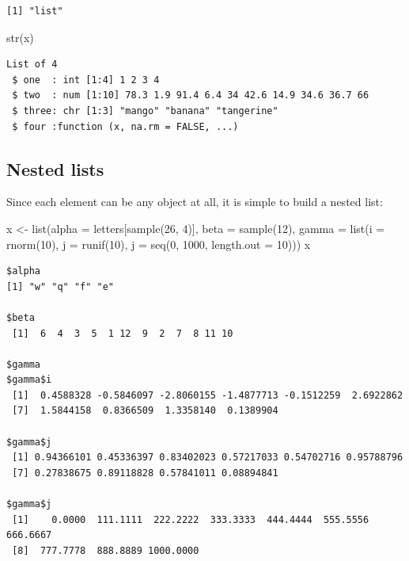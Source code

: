 \documentclass[
]{book}
\newenvironment{Shaded}{\begin{snugshade}}{\end{snugshade}}
\newcommand{\AttributeTok}[1]{\textcolor[rgb]{0.77,0.63,0.00}{#1}}
\newcommand{\DecValTok}[1]{\textcolor[rgb]{0.00,0.00,0.81}{#1}}
\newcommand{\FunctionTok}[1]{\textcolor[rgb]{0.00,0.00,0.00}{#1}}
\newcommand{\NormalTok}[1]{#1}
\newcommand{\OtherTok}[1]{\textcolor[rgb]{0.56,0.35,0.01}{#1}}
\begin{document}
\begin{verbatim}
[1] "list"
\end{verbatim}

\begin{Shaded}
\begin{Highlighting}[]
\FunctionTok{str}\NormalTok{(x)}
\end{Highlighting}
\end{Shaded}

\begin{verbatim}
List of 4
 $ one  : int [1:4] 1 2 3 4
 $ two  : num [1:10] 78.3 1.9 91.4 6.4 34 42.6 14.9 34.6 36.7 66
 $ three: chr [1:3] "mango" "banana" "tangerine"
 $ four :function (x, na.rm = FALSE, ...)  
\end{verbatim}

\hypertarget{nested-lists}{%
\subsection{Nested lists}\label{nested-lists}}

Since each element can be any object at all, it is simple to build a nested list:

\begin{Shaded}
\begin{Highlighting}[]
\NormalTok{x }\OtherTok{\textless{}{-}} \FunctionTok{list}\NormalTok{(}\AttributeTok{alpha =}\NormalTok{ letters[}\FunctionTok{sample}\NormalTok{(}\DecValTok{26}\NormalTok{, }\DecValTok{4}\NormalTok{)],}
          \AttributeTok{beta =} \FunctionTok{sample}\NormalTok{(}\DecValTok{12}\NormalTok{),}
          \AttributeTok{gamma =} \FunctionTok{list}\NormalTok{(}\AttributeTok{i =} \FunctionTok{rnorm}\NormalTok{(}\DecValTok{10}\NormalTok{),}
                       \AttributeTok{j =} \FunctionTok{runif}\NormalTok{(}\DecValTok{10}\NormalTok{),}
                       \AttributeTok{j =} \FunctionTok{seq}\NormalTok{(}\DecValTok{0}\NormalTok{, }\DecValTok{1000}\NormalTok{, }\AttributeTok{length.out =} \DecValTok{10}\NormalTok{)))}
\NormalTok{x}
\end{Highlighting}
\end{Shaded}

\begin{verbatim}
$alpha
[1] "w" "q" "f" "e"

$beta
 [1]  6  4  3  5  1 12  9  2  7  8 11 10

$gamma
$gamma$i
 [1]  0.4588328 -0.5846097 -2.8060155 -1.4877713 -0.1512259  2.6922862
 [7]  1.5844158  0.8366509  1.3358140  0.1389904

$gamma$j
 [1] 0.94366101 0.45336397 0.83402023 0.57217033 0.54702716 0.95788796
 [7] 0.27838675 0.89118828 0.57841011 0.08894841

$gamma$j
 [1]    0.0000  111.1111  222.2222  333.3333  444.4444  555.5556  666.6667
 [8]  777.7778  888.8889 1000.0000
\end{verbatim}
\end{document}
